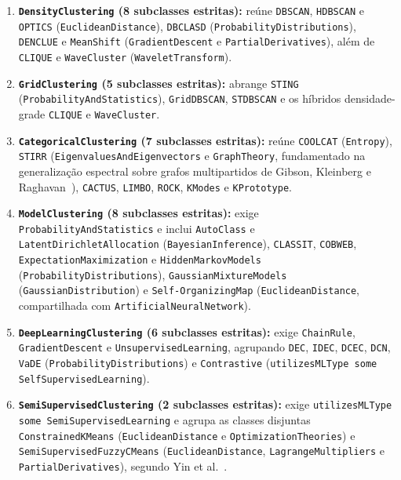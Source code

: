 \documentclass[11pt,a4paper]{article}
\newcommand{\onto}[1]{\texttt{#1}}
\begin{document}
\begin{enumerate}[leftmargin=*,nosep]
  \item \textbf{\onto{DensityClustering} (8 subclasses estritas):} reúne \onto{DBSCAN}, \onto{HDBSCAN} e \onto{OPTICS} (\onto{EuclideanDistance}), \onto{DBCLASD} (\onto{ProbabilityDistributions}), \onto{DENCLUE} e \onto{MeanShift} (\onto{GradientDescent} e \onto{PartialDerivatives}), além de \onto{CLIQUE} e \onto{WaveCluster} (\onto{WaveletTransform}).
  \item \textbf{\onto{GridClustering} (5 subclasses estritas):} abrange \onto{STING} (\onto{ProbabilityAndStatistics}), \onto{GridDBSCAN}, \onto{STDBSCAN} e os híbridos densidade-grade \onto{CLIQUE} e \onto{WaveCluster}.
  \item \textbf{\onto{CategoricalClustering} (7 subclasses estritas):} reúne \onto{COOLCAT} (\onto{Entropy}), \onto{STIRR} (\onto{EigenvaluesAndEigenvectors} e \onto{GraphTheory}, fundamentado na generalização espectral sobre grafos multipartidos de Gibson, Kleinberg e Raghavan~\cite{gibson1998clustering}), \onto{CACTUS}, \onto{LIMBO}, \onto{ROCK}, \onto{KModes} e \onto{KPrototype}.
  \item \textbf{\onto{ModelClustering} (8 subclasses estritas):} exige \onto{ProbabilityAndStatistics} e inclui \onto{AutoClass} e \onto{LatentDirichletAllocation} (\onto{BayesianInference}), \onto{CLASSIT}, \onto{COBWEB}, \onto{ExpectationMaximization} e \onto{HiddenMarkovModels} (\onto{ProbabilityDistributions}), \onto{GaussianMixtureModels} (\onto{GaussianDistribution}) e \onto{Self-OrganizingMap} (\onto{EuclideanDistance}, compartilhada com \onto{ArtificialNeuralNetwork}).
  \item \textbf{\onto{DeepLearningClustering} (6 subclasses estritas):} exige \onto{ChainRule}, \onto{GradientDescent} e \onto{UnsupervisedLearning}, agrupando \onto{DEC}, \onto{IDEC}, \onto{DCEC}, \onto{DCN}, \onto{VaDE} (\onto{ProbabilityDistributions}) e \onto{Contrastive} (\onto{utilizesMLType some SelfSupervisedLearning}).
  \item \textbf{\onto{SemiSupervisedClustering} (2 subclasses estritas):} exige \onto{utilizesMLType some SemiSupervisedLearning} e agrupa as classes disjuntas \onto{ConstrainedKMeans} (\onto{EuclideanDistance} e \onto{OptimizationTheories}) e \onto{SemiSupervisedFuzzyCMeans} (\onto{EuclideanDistance}, \onto{LagrangeMultipliers} e \onto{PartialDerivatives}), segundo Yin et al.~\cite{yin2026rapid}.
\end{enumerate}
\end{document}
